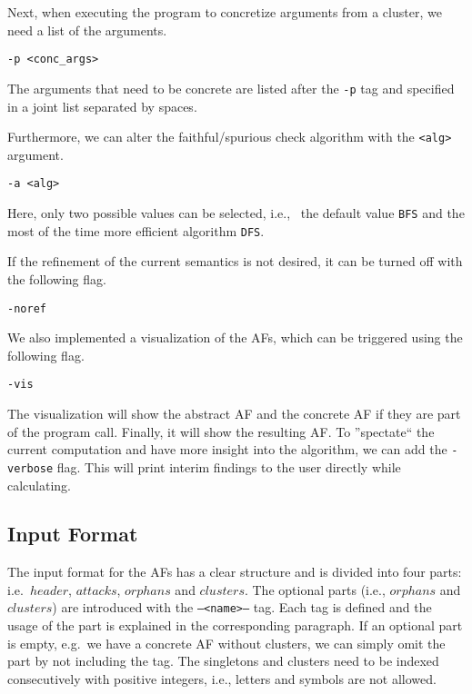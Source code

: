 Next, when executing the program to concretize arguments from a cluster, we need a list of the arguments.

\begin{center}
    \texttt{-p <conc\_args>} 
\end{center}

The arguments that need to be concrete are listed after the \texttt{-p} tag and specified in a joint list separated by spaces.

Furthermore, we can alter the faithful/spurious check algorithm with the \texttt{<alg>} argument.

\begin{center}
    \texttt{-a <alg>}
\end{center}

Here, only two possible values can be selected, i.e., \ the default value \texttt{BFS} and the most of the time more efficient algorithm \texttt{DFS}.

If the refinement of the current semantics is not desired, it can be turned off with the following flag.

\begin{center}
    \texttt{-noref}
\end{center}

We also implemented a visualization of the AFs, which can be triggered using the following flag.

\begin{center}
    \texttt{-vis}
\end{center}

The visualization will show the abstract AF and the concrete AF if they are part of the program call. Finally, it will show the resulting AF. To ''spectate`` the current computation and have more insight into the algorithm, we can add the \texttt{-verbose} flag. This will print interim findings to the user directly while calculating.


\subsection{Input Format}
The input format for the AFs has a clear structure and is divided into four parts: i.e.\ $header$, $attacks$, $orphans$ and $clusters$. The optional parts (i.e., $orphans$ and $clusters$) are introduced with the \texttt{--<name>--} tag. Each tag is defined and the usage of the part is explained in the corresponding paragraph. If an optional part is empty, e.g.\ we have a concrete AF without clusters, we can simply omit the part by not including the tag. The singletons and clusters need to be indexed consecutively with positive integers, i.e., letters and symbols are not allowed.

